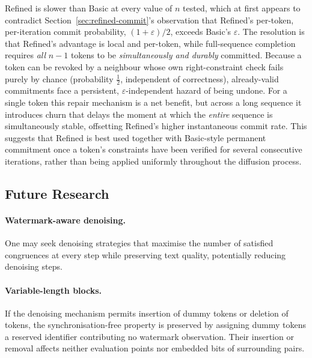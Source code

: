 \documentclass[a4paper,11pt]{llncs}
\begin{document}
\begin{example}
Refined is slower than Basic at every value of $n$ tested,
which at first appears to contradict
Section~\ref{sec:refined-commit}'s observation that Refined's
per-token, per-iteration commit probability, $(1+\varepsilon)/2$,
exceeds Basic's $\varepsilon$. The resolution is that Refined's
advantage is local and per-token, while full-sequence completion
requires \emph{all} $n-1$ tokens to be \emph{simultaneously and
durably} committed. Because a token can be revoked by a neighbour
whose own right-constraint check fails purely by chance
(probability $\tfrac12$, independent of correctness), already-valid
commitments face a persistent, $\varepsilon$-independent hazard of
being undone. For a single token this repair mechanism is a net
benefit, but across a long sequence it introduces churn that
delays the moment at which the \emph{entire} sequence is
simultaneously stable, offsetting Refined's higher instantaneous
commit rate. This suggests that Refined is best used together with
Basic-style permanent commitment once a token's constraints have
been verified for several consecutive iterations, rather than
being applied uniformly throughout the diffusion process.
\end{example}


\subsection{Future Research}
\label{sec:diffusion-future}

\paragraph{Watermark-aware denoising.}
One may seek denoising strategies that maximise the number of
satisfied congruences at every step while preserving text quality,
potentially reducing denoising steps.

\paragraph{Variable-length blocks.}
If the denoising mechanism permits insertion of dummy tokens or
deletion of tokens, the synchronisation-free property is preserved
by assigning dummy tokens a reserved identifier contributing no
watermark observation. Their insertion or removal affects neither
evaluation points nor embedded bits of surrounding pairs.
\end{document}
